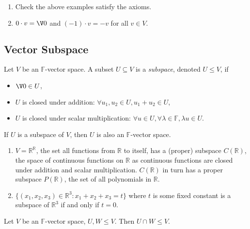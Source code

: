 \documentclass[a4paper]{article}
\theoremstyle{definition}
\begin{document}
\begin{ex}\leavevmode
  \begin{enumerate}
  \item Check the above examples satisfy the axioms.
    \item $0\cdot v = \V 0$ and $(-1)\cdot v = -v$ for all $v \in V$.
  \end{enumerate}
\end{ex}

\subsection{Vector Subspace}

\begin{definition}
  Let $V$ be an $\mathbb{F}$-vector space. A subset $U \subseteq V$ is a \emph{subspace}, denoted $U \leq V$, if
  \begin{itemize}
  \item $\V 0 \in U$,
  \item $U$ is closed under addition: $\forall u_1, u_2 \in U, u_1+u_2 \in U$,
    \item $U$ is closed under scalar multiplication: $\forall u \in U, \forall \lambda \in \mathbb{F}, \lambda u \in U$.
  \end{itemize}
\end{definition}

\begin{ex}
  If $U$ is a subspace of $V$, then $U$ is also an $\mathbb{F}$-vector space.
\end{ex}

\begin{eg}\leavevmode
  \begin{enumerate}
  \item $V = \mathbb{R}^{\mathbb{R}}$, the set all functions from $\mathbb{R}$ to itself, has a (proper) subspace $C(\mathbb{R})$, the space of continuous functions on $\mathbb{R}$ as continuous functions are closed under addition and scalar multiplication. $C(\mathbb{R})$ in turn has a proper subspace $P(\mathbb{R})$, the set of all polynomials in $\mathbb{R}$.
    \item $\{(x_1,x_2,x_3) \in \mathbb{R}^3: x_1+x_2+x_3 = t\}$ where $t$ is some fixed constant is a subspace of $\mathbb{R}^3$ if and only if $t = 0$.
  \end{enumerate}
\end{eg}

\begin{proposition}
  Let $V$ be an $\mathbb{F}$-vector space, $U, W \leq V$. Then $U \cap W \leq V$.
\end{proposition}
\end{document}

